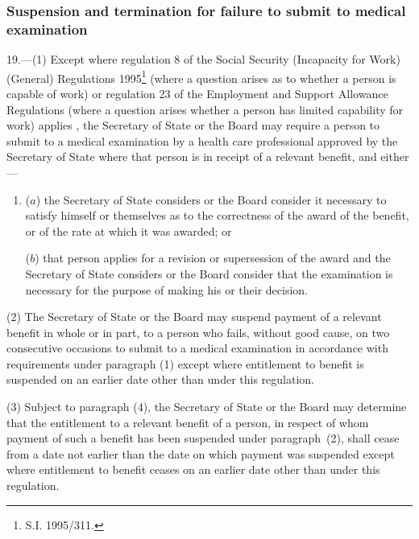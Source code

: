 \documentclass[12pt,a4paper]{article}
\begin{document}
\subsubsection[19. Suspension and termination for failure to submit to medical examination]{Suspension and termination for failure to submit to medical examination}

19.—(1) Except where regulation 8 of the Social Security (Incapacity for Work) (General) Regulations 1995\footnote{\frenchspacing S.I. 1995/311.} 
(where a question arises as to whether a person is capable of work)
or regulation 23 of the Employment and Support Allowance Regulations (where a question arises whether a person has limited capability for work) applies%
, the Secretary of State 
or the Board  %
may require a person to submit to a medical examination by a 
health care professional approved by the Secretary of State  %
where that person is in receipt of a relevant benefit, and either—
\begin{enumerate}\item[]
($a$) the Secretary of State considers 
or the Board consider  %
it necessary to satisfy himself 
or themselves  %
as to the correctness of the award of the benefit, or of the rate at which it was awarded; or

($b$) that person applies for a revision or supersession of the award and the Secretary of State considers 
or the Board consider  %
that the examination is necessary for the purpose of making his 
or their  %
decision.
\end{enumerate}

(2) The Secretary of State 
or the Board  %
may suspend payment of a relevant benefit in whole or in part, to a person who fails, without good cause, on two consecutive occasions to submit to a medical examination in accordance with requirements under paragraph (1) except where entitlement to benefit is suspended on an earlier date other than under this regulation.

(3) Subject to paragraph (4), the Secretary of State 
or the Board  %
may determine that the entitlement to a relevant benefit of a person, in respect of whom payment of such a benefit has been suspended under paragraph~(2), shall cease from a date not earlier than the date on which payment was suspended except where entitlement to benefit ceases on an earlier date other than under this regulation.
\end{document}

